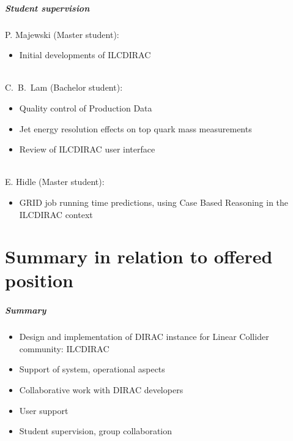 \documentclass{beamer}
\begin{document}
 {
 
 \begin{frame}
 \frametitle{Student supervision}
 P. Majewski (Master student): 
 \begin{itemize}
   \item Initial developments of ILCDIRAC
 \end{itemize}
 ~\\
 C.~B.~Lam (Bachelor student):
\begin{itemize}
  \item Quality control of Production Data
  \item Jet energy resolution effects on top quark mass measurements
  \item Review of ILCDIRAC user interface
\end{itemize}
~\\
E. Hidle (Master student):
\begin{itemize}
  \item GRID job running time predictions, using Case Based Reasoning in the
  ILCDIRAC context
\end{itemize}
 \end{frame}
} 
\part{Summary in relation to offered position}
\begin{frame}
\partpage
\end{frame}
\begin{frame}
\frametitle{Summary} 
\begin{itemize}
  \item Design and implementation of DIRAC instance for Linear Collider
  community: ILCDIRAC
  \item Support of system, operational aspects
  \item Collaborative work with DIRAC developers
  \item User support
  \item Student supervision, group collaboration
\end{itemize}
\end{frame}
\end{document}
